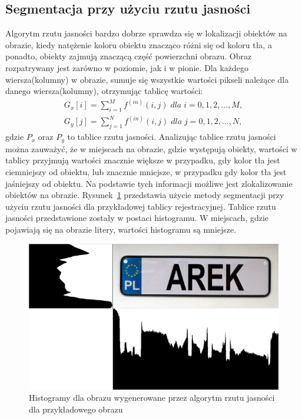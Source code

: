 \subsection{Segmentacja przy użyciu rzutu jasności} \label{ssec:rzut_jasnosci}
Algorytm rzutu jasności bardzo dobrze sprawdza się w lokalizacji obiektów na obrazie, kiedy natężenie koloru obiektu znacząco różni się od koloru tła, a ponadto, obiekty zajmują znaczącą część powierzchni obrazu. Obraz rozpatrywany jest zarówno w poziomie, jak i w pionie. Dla każdego wiersza(kolumny) w obrazie, sumuje się wszystkie wartości pikseli należące dla danego wiersza(kolumny), otrzymując tablicę wartości:
\begin{gather*}
  G_x[i] = \sum\limits_{i=1}^M f^{(in)}(i, j) \; dla \; i = 0,1,2,...,M, \\
  G_y[j] = \sum\limits_{j=1}^N f^{(in)}(i, j) \; dla \; j = 0,1,2,...,N,
\end{gather*} gdzie $P_x$ oraz $P_y$ to tablice rzutu jasności. Analizując tablice rzutu jasności można zauważyć, że w miejscach na obrazie, gdzie występują obiekty, wartości w tablicy przyjmują wartości znacznie większe w przypadku, gdy kolor tła jest ciemniejszy od obiektu, lub znacznie mniejsze, w przypadku gdy kolor tła jest jaśniejszy od obiektu. Na podstawie tych informacji możliwe jest zlokalizowanie obiektów na obrazie. Rysunek~\ref{fig:rzut_jasnosci} przedstawia użycie metody segmentacji przy użyciu rzutu jasności dla przykładowej tablicy rejestracyjnej. Tablice rzutu jasności przedstawione zostały w postaci histogramu. W miejscach, gdzie pojawiają się na obrazie litery, wartości histogramu są mniejsze.

\begin{figure}
  \centering
  \includegraphics[width=15cm]{img/rzut-jasnosci}
  \caption{Histogramy dla obrazu wygenerowane przez algorytm rzutu jasności dla przykładowego obrazu}
  \label{fig:rzut_jasnosci}
\end{figure}
